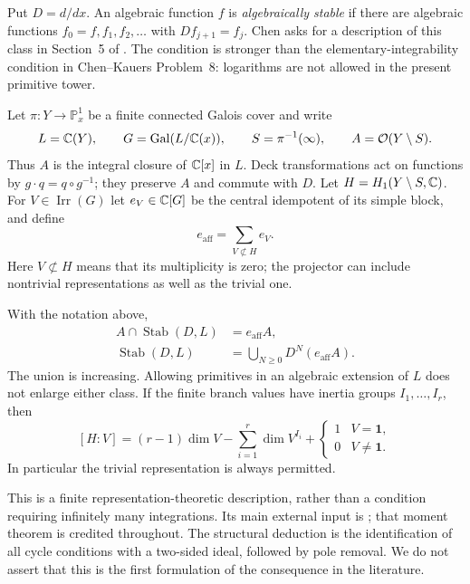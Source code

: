 Put $D=d/dx$. An algebraic function $f$ is \emph{algebraically stable} if there
are algebraic functions $f_0=f,f_1,f_2,\ldots$ with $Df_{j+1}=f_j$.
Chen asks for a description of this class in Section~5 of
\cite{Chen2022}. The condition is stronger than the elementary-integrability
condition in Chen--Kauers Problem~8: logarithms are not allowed in the present
primitive tower.

Let $\pi:Y\to\mathbb P^1_x$ be a finite connected Galois cover and write
\[
 L=\mathbb C(Y),\qquad G=\operatorname{Gal}(L/\mathbb C(x)),\qquad
 S=\pi^{-1}(\infty),\qquad A=\mathcal O(Y\setminus S).
\]
Thus $A$ is the integral closure of $\mathbb C[x]$ in $L$. Deck transformations act on
functions by $g\cdot q=q\circ g^{-1}$; they preserve $A$ and commute with $D$.
Let $H=H_1(Y\setminus S,\mathbb C)$. For $V\in\operatorname{Irr}(G)$ let $e_V\in\mathbb C[G]$ be the
central idempotent of its simple block, and define
\begin{equation}\label{aff:eq:good}
 e_{\mathrm{aff}}=\sum_{V\not\subset H}e_V.
\end{equation}
Here $V\not\subset H$ means that its multiplicity is zero; the projector
can include nontrivial representations as well as the trivial one.

\begin{theorem}\label{aff:thm:main}
With the notation above,
\begin{align}
 A\cap\operatorname{Stab}(D,L)&=e_{\mathrm{aff}}A,\label{aff:eq:regular-class}\\
 \operatorname{Stab}(D,L)&=\bigcup_{N\ge0}D^N(e_{\mathrm{aff}}A).\label{aff:eq:full-class}
\end{align}
The union is increasing. Allowing primitives in an algebraic extension of $L$
does not enlarge either class. If the finite branch values have inertia groups
$I_1,\ldots,I_r$, then
\begin{equation}\label{aff:eq:character-formula}
 [H:V]=(r-1)\dim V-\sum_{i=1}^r\dim V^{I_i}
              +\begin{cases}1&V=\mathbf1,\\0&V\ne\mathbf1.\end{cases}
\end{equation}
In particular the trivial representation is always permitted.
\end{theorem}

This is a finite representation-theoretic description, rather than a condition
requiring infinitely many integrations. Its main external input is
\cite[Theorem~2.1]{GP2014}; that moment theorem is credited throughout. The
structural deduction is the identification of all cycle conditions with a
two-sided ideal, followed by pole removal. We do not assert that this is the
first formulation of the consequence in the literature.

